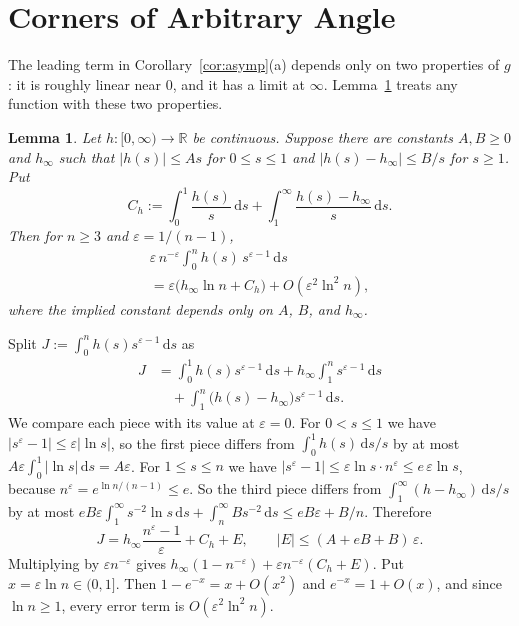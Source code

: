 \documentclass[journal]{IEEEtran}
\newtheorem{lemma}{Lemma}
\newcommand{\eps}{\varepsilon}
\newcommand{\dd}{\,\mathrm{d}}
\newcommand{\R}{\mathbb{R}}
\begin{document}
\section{Corners of Arbitrary Angle}\label{sec:angle}

The leading term in Corollary~\ref{cor:asymp}(a) depends only on two properties of $g$: it is
roughly linear near $0$, and it has a limit at $\infty$. Lemma~\ref{lem:general} treats any
function with these two properties.

\begin{lemma}\label{lem:general}
Let $h:[0,\infty)\to\R$ be continuous. Suppose there are constants $A,B\ge0$ and $h_\infty$
such that $|h(s)|\le As$ for $0\le s\le1$ and $|h(s)-h_\infty|\le B/s$ for $s\ge1$. Put
\[
  C_h:=\int_0^1\frac{h(s)}{s}\dd s+\int_1^\infty\frac{h(s)-h_\infty}{s}\dd s.
\]
Then for $n\ge3$ and $\eps=1/(n-1)$,
\begin{multline*}
  \eps\,n^{-\eps}\int_0^nh(s)\,s^{\eps-1}\dd s\\
  =\eps\bigl(h_\infty\ln n+C_h\bigr)+O(\eps^2\ln^2n),
\end{multline*}
where the implied constant depends only on $A$, $B$, and $h_\infty$.
\end{lemma}

\begin{IEEEproof}
Split $J:=\int_0^nh(s)s^{\eps-1}\dd s$ as
\begin{align*}
  J&=\int_0^1h(s)s^{\eps-1}\dd s+h_\infty\int_1^ns^{\eps-1}\dd s\\
  &\quad+\int_1^n\bigl(h(s)-h_\infty\bigr)s^{\eps-1}\dd s.
\end{align*}
We compare each piece with its value at $\eps=0$. For $0<s\le1$ we have
$|s^{\eps}-1|\le\eps|\ln s|$, so the first piece differs from $\int_0^1h(s)\dd s/s$ by at most
$A\eps\int_0^1|\ln s|\dd s=A\eps$. For $1\le s\le n$ we have
$|s^{\eps}-1|\le\eps\ln s\cdot n^{\eps}\le e\,\eps\ln s$, because
$n^{\eps}=e^{\ln n/(n-1)}\le e$. So the third piece differs from
$\int_1^\infty(h-h_\infty)\dd s/s$ by at most
$eB\eps\int_1^\infty s^{-2}\ln s\dd s+\int_n^\infty Bs^{-2}\dd s\le eB\eps+B/n$. Therefore
\[
  J=h_\infty\frac{n^{\eps}-1}{\eps}+C_h+E,\qquad|E|\le(A+eB+B)\,\eps.
\]
Multiplying by $\eps n^{-\eps}$ gives $h_\infty(1-n^{-\eps})+\eps n^{-\eps}(C_h+E)$. Put
$x=\eps\ln n\in(0,1]$. Then $1-e^{-x}=x+O(x^2)$ and $e^{-x}=1+O(x)$, and since $\ln n\ge1$,
every error term is $O(\eps^2\ln^2n)$.
\end{IEEEproof}
\end{document}
